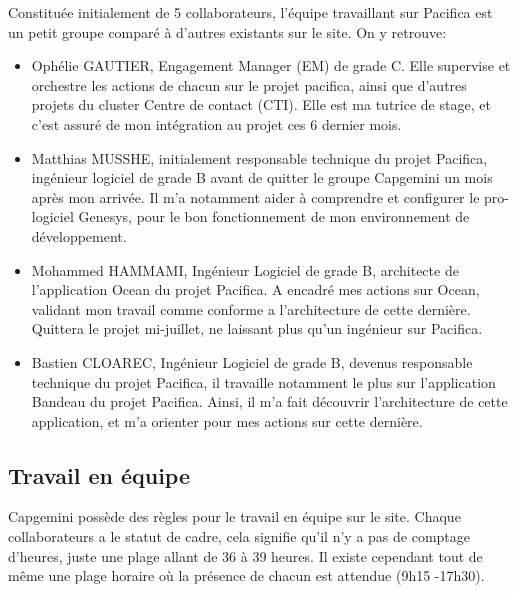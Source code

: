 \documentclass{rapport}
\begin{document}
Constituée initialement de 5 collaborateurs, l'équipe travaillant sur Pacifica est un petit groupe comparé à d'autres existants sur le site.
On y retrouve:\\

\begin{itemize}
  \item Ophélie GAUTIER, Engagement Manager (EM) de grade C. Elle supervise et orchestre les actions de chacun sur le projet pacifica, ainsi que d'autres projets du cluster Centre de contact (CTI). Elle est ma tutrice de stage, et c'est assuré de mon intégration au projet ces 6 dernier mois.\\
  
  \item Matthias MUSSHE, initialement responsable technique du projet Pacifica, ingénieur logiciel de grade B avant de quitter le groupe Capgemini un mois après mon arrivée. Il m'a notamment aider à comprendre et configurer le pro-logiciel Genesys, pour le bon fonctionnement de mon environnement de développement.\\
  
  \item Mohammed HAMMAMI, Ingénieur Logiciel de grade B, architecte de l'application Ocean du projet Pacifica. A encadré mes actions sur Ocean, validant mon travail comme conforme a l'architecture de cette dernière. Quittera le projet mi-juillet, ne laissant plus qu'un ingénieur sur Pacifica.\\
  
  \item Bastien CLOAREC, Ingénieur Logiciel de grade B, devenus responsable technique du projet Pacifica, il travaille notamment le plus sur l'application Bandeau du projet Pacifica. Ainsi, il m'a fait découvrir l'architecture de cette application, et m'a orienter pour mes actions sur cette dernière.\\
  
\end{itemize}

\subsection{Travail en équipe}
Capgemini possède des règles pour le travail en équipe sur le site. Chaque collaborateurs a le statut de cadre, cela signifie qu'il n'y a pas de comptage d'heures, juste une plage allant de 36 à 39 heures. Il existe cependant tout de même une plage horaire où la présence de chacun est attendue (9h15 -17h30).\\
\end{document}

